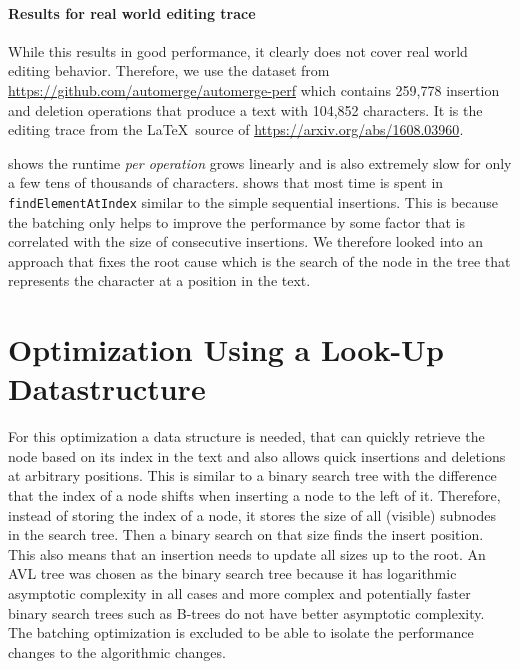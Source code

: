 
\paragraph{Results for real world editing trace}

While this results in good performance, it clearly does not cover real world editing behavior. Therefore, we use the dataset from \url{https://github.com/automerge/automerge-perf} which contains 259,778 insertion and deletion operations that produce a text with 104,852 characters. It is the editing trace from the \LaTeX~source of \url{https://arxiv.org/abs/1608.03960}.

 shows the runtime \textit{per operation} grows linearly and is also extremely slow for only a few tens of thousands of characters.  shows that most time is spent in \texttt{findElementAtIndex} similar to the simple sequential insertions.
This is because the batching only helps to improve the performance by some factor that is correlated with the size of consecutive insertions. We therefore looked into an approach that fixes the root cause which is the search of the node in the tree that represents the character at a position in the text.



\clearpage

\section{Optimization Using a Look-Up Datastructure} \label{sec:optimization-look-up-datastructure}

For this optimization a data structure is needed, that can quickly retrieve the node based on its index in the text and also allows quick insertions and deletions at arbitrary positions. This is similar to a binary search tree with the difference that the index of a node shifts when inserting a node to the left of it. Therefore, instead of storing the index of a node, it stores the size of all (visible) subnodes in the search tree. Then a binary search on that size finds the insert position. This also means that an insertion needs to update all sizes up to the root. An AVL tree was chosen as the binary search tree because it has logarithmic asymptotic complexity in all cases and more complex and potentially faster binary search trees such as B-trees do not have better asymptotic complexity.
The batching optimization is excluded to be able to isolate the performance changes to the algorithmic changes.

